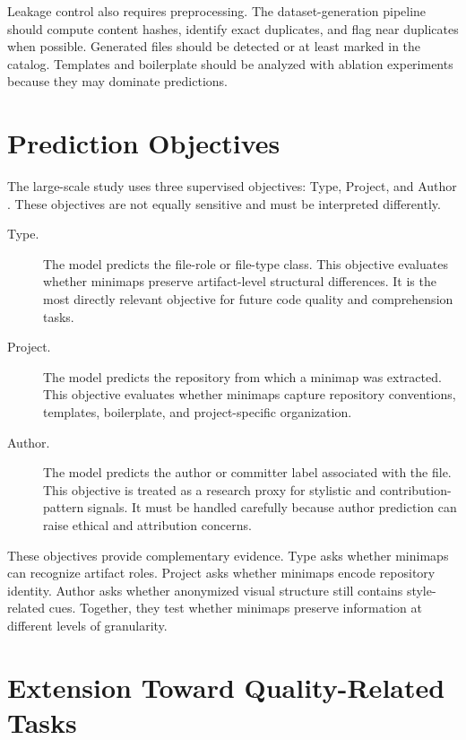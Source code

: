 Leakage control also requires preprocessing. The dataset-generation pipeline
should compute content hashes, identify exact duplicates, and flag near
duplicates when possible. Generated files should be detected or at least marked
in the catalog. Templates and boilerplate should be analyzed with ablation
experiments because they may dominate predictions.

\section{Prediction Objectives}

The large-scale study uses three supervised objectives: Type, Project, and
Author \cite{gebara2025ciarp}. These objectives are not equally sensitive and
must be interpreted differently.

\begin{description}
    \item[Type.] The model predicts the file-role or file-type class. This
    objective evaluates whether minimaps preserve artifact-level structural
    differences. It is the most directly relevant objective for future code
    quality and comprehension tasks.

    \item[Project.] The model predicts the repository from which a minimap was
    extracted. This objective evaluates whether minimaps capture repository
    conventions, templates, boilerplate, and project-specific organization.

    \item[Author.] The model predicts the author or committer label associated
    with the file. This objective is treated as a research proxy for stylistic
    and contribution-pattern signals. It must be handled carefully because
    author prediction can raise ethical and attribution concerns.
\end{description}

These objectives provide complementary evidence. Type asks whether minimaps can
recognize artifact roles. Project asks whether minimaps encode repository
identity. Author asks whether anonymized visual structure still contains
style-related cues. Together, they test whether minimaps preserve information at
different levels of granularity.

\section{Extension Toward Quality-Related Tasks}

